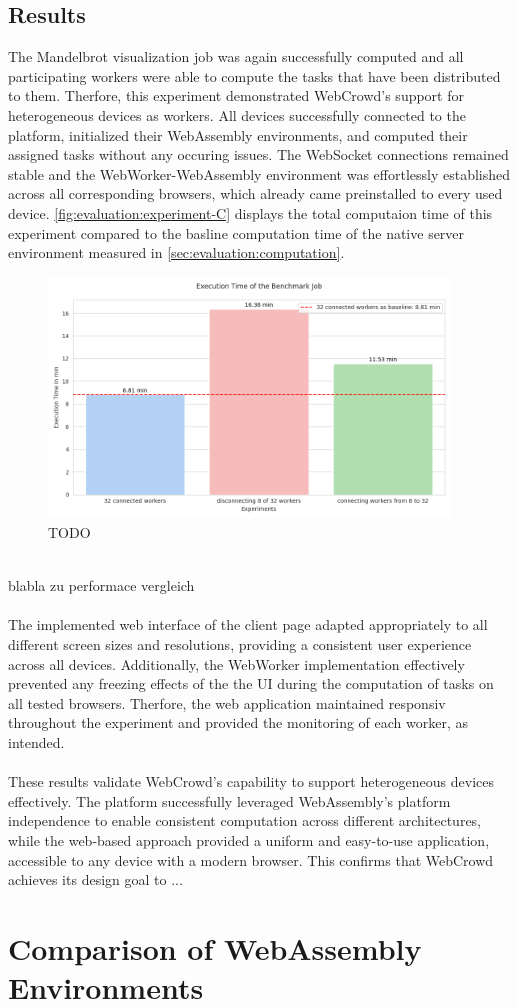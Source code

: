 \subsection{Results}
The Mandelbrot visualization job was again successfully computed and all participating workers were able to compute the tasks that have been distributed to them. Therfore, this experiment demonstrated WebCrowd's support for heterogeneous devices as workers. All devices successfully connected to the platform, initialized their WebAssembly environments, and computed their assigned tasks without any occuring issues. The WebSocket connections remained stable and the WebWorker-WebAssembly environment was effortlessly established across all corresponding browsers, which already came preinstalled to every used device. \autoref{fig:evaluation:experiment-C} displays the total computaion time of this experiment compared to the basline computation time of the native server environment measured in \autoref{sec:evaluation:computation}.
\begin{figure}[htbp]
    \centering
    \includegraphics[width=0.95\textwidth]{gfx/figures/Evaluation_B.png}
    \caption{TODO}
    \label{fig:evaluation:experiment-C}
\end{figure}
~\\
blabla zu performace vergleich
\\~\\
The implemented web interface of the client page adapted appropriately to all different screen sizes and resolutions, providing a consistent user experience across all devices. Additionally, the WebWorker implementation effectively prevented any freezing effects of the the \ac{UI} during the computation of tasks on all tested browsers. Therfore, the web application maintained responsiv throughout the experiment and provided the monitoring of each worker, as intended.
\\~\\
These results validate WebCrowd's capability to support heterogeneous devices effectively. The platform successfully leveraged WebAssembly's platform independence to enable consistent computation across different architectures, while the web-based approach provided a uniform and easy-to-use application, accessible to any device with a modern browser. This confirms that WebCrowd achieves its design goal to ...

\section{Comparison of WebAssembly Environments}
\label{sec:evaluation:languages}